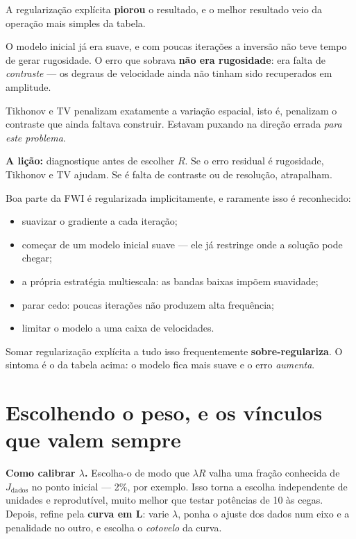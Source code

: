 \documentclass[11pt,a4paper,oneside]{report}
\begin{document}
A regulariza\c{c}\~ao expl\'icita \textbf{piorou} o resultado, e o melhor
resultado veio da opera\c{c}\~ao mais simples da tabela.

\begin{teoria}
O modelo inicial j\'a era suave, e com poucas itera\c{c}\~oes a invers\~ao
n\~ao teve tempo de gerar rugosidade. O erro que sobrava \textbf{n\~ao era
rugosidade}: era falta de \emph{contraste} --- os degraus de velocidade ainda
n\~ao tinham sido recuperados em amplitude.

Tikhonov e TV penalizam exatamente a varia\c{c}\~ao espacial, isto \'e,
penalizam o contraste que ainda faltava construir. Estavam puxando na
dire\c{c}\~ao errada \emph{para este problema}.

\textbf{A li\c{c}\~ao:} diagnostique antes de escolher $R$. Se o erro residual
\'e rugosidade, Tikhonov e TV ajudam. Se \'e falta de contraste ou de
resolu\c{c}\~ao, atrapalham.
\end{teoria}

\begin{pratica}
Boa parte da FWI \'e regularizada implicitamente, e raramente isso \'e
reconhecido:
\begin{itemize}[leftmargin=*, itemsep=1pt]
\item suavizar o gradiente a cada itera\c{c}\~ao;
\item come\c{c}ar de um modelo inicial suave --- ele j\'a restringe onde a
solu\c{c}\~ao pode chegar;
\item a pr\'opria estrat\'egia multiescala: as bandas baixas imp\~oem
suavidade;
\item parar cedo: poucas itera\c{c}\~oes n\~ao produzem alta frequ\^encia;
\item limitar o modelo a uma caixa de velocidades.
\end{itemize}

Somar regulariza\c{c}\~ao expl\'icita a tudo isso frequentemente
\textbf{sobre-regulariza}. O sintoma \'e o da tabela acima: o modelo fica mais
suave e o erro \emph{aumenta}.
\end{pratica}

\section{Escolhendo o peso, e os v\'inculos que valem sempre}

\textbf{Como calibrar $\lambda$.} Escolha-o de modo que $\lambda R$ valha uma
fra\c{c}\~ao conhecida de $J_{\text{dados}}$ no ponto inicial --- 2\%, por
exemplo. Isso torna a escolha independente de unidades e reprodut\'ivel, muito
melhor que testar pot\^encias de 10 \`as cegas. Depois, refine pela
\textbf{curva em L}: varie $\lambda$, ponha o ajuste dos dados num eixo e a
penalidade no outro, e escolha o \emph{cotovelo} da curva.
\end{document}

